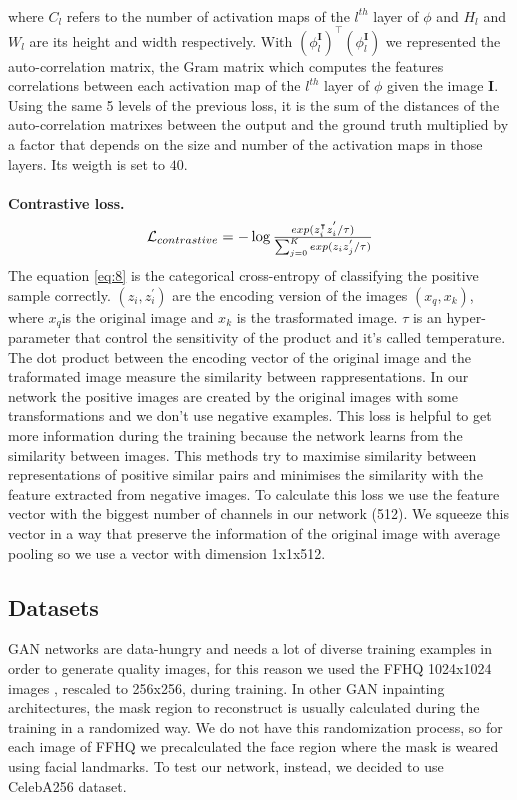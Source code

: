 \documentclass[10pt,twocolumn,letterpaper]{article}
\begin{document}
\\
where \(C_l\) refers to the number of activation maps of the \(l^{th}\) layer of \(\phi\) and \(H_l\) and \(W_l\) are its height and width respectively. With \((\phi^{\mathbf{I}}_l)^\top(\phi^{\mathbf{I}}_l)\) we represented the auto-correlation matrix, the Gram matrix\cite{gatys1508neural} which computes the features correlations between each activation map of the \(l^{th}\) layer of \(\phi\) given the image \(\mathbf{I}\).
\\
Using the same 5 levels of the previous loss, it is the sum of the distances of the auto-correlation matrixes between the output and the ground truth multiplied by a factor that depends on the size and number of the activation maps in those layers. Its weigth is set to \(40\).
\\
\\
\textbf{Contrastive loss.}
\begin{equation}
    \resizebox{.47 \textwidth}{!}{%
    $\mathcal{L}_{contrastive} = - \log{\frac{exp(z_{i}^\intercal z_{i}^{'}/\tau)}{\sum_{j=0}^{K}exp(z_{i}z_{j}^{'}/\tau)}}
    $%
    }
\end{equation}
The equation \eqref{eq:8} \cite{le2020contrastive} is the categorical cross-entropy of classifying the positive sample correctly\cite{oord2018representation}. \((z_{i}, z_{i}^{'})\) are the encoding version of the images \((x_{q}, x_{k})\), where \(x_{q}\)is the original image and \(x_{k}\) is the trasformated image. \(\tau\) is an hyper-parameter that control the sensitivity of the product and it's called temperature. The dot product between the encoding vector of the original image and the traformated image measure the similarity between rappresentations. In our network the positive images are created by the original images with some transformations and we don't use negative examples.
This loss is helpful to get more information during the training because the network learns from the similarity between images. This methods try to maximise similarity between representations of positive similar pairs and minimises the similarity with the feature extracted from negative images\cite{le2020contrastive}.
To calculate this loss we use the feature vector with the biggest number of channels in our network (512). We squeeze this vector in a way that preserve the information of the original image with average pooling so we use a vector with dimension 1x1x512. 

\subsection{Datasets}
GAN networks are data-hungry and needs a lot of diverse training examples in
order to generate quality images, for this reason we used the FFHQ 1024x1024
images \cite{karras2019style}, rescaled to 256x256, during training.  In other GAN inpainting
architectures, the mask region to reconstruct is usually calculated during the
training in a randomized way.  We do not have this randomization process, so for
each image of FFHQ we precalculated the face region where the mask is weared
using facial landmarks.  To test our network, instead, we decided to use CelebA256 dataset.
\end{document}
